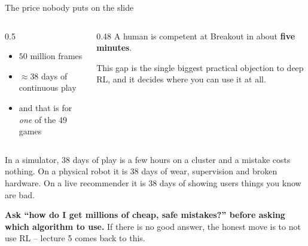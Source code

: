 \documentclass[aspectratio=169]{beamer}
\begin{document}
\begin{frame}{The price nobody puts on the slide}
  \begin{columns}[T]
    \begin{column}{0.5\textwidth}
      \begin{tcolorbox}[colback=armred!8, colframe=armred, boxrule=0.7pt, arc=2pt,
                        title={\textbf{DQN's budget, per game}}]
        \small
        \begin{itemize}\itemsep3pt
          \item $50$ million frames
          \item $\approx 38$ days of continuous play
          \item and that is for \emph{one} of the 49 games
        \end{itemize}
      \end{tcolorbox}
    \end{column}
    \begin{column}{0.48\textwidth}
      \vskip 6pt
      \small
      A human is competent at Breakout in about \textbf{five minutes}.

      \vskip 6pt
      This gap is the single biggest practical objection to deep RL, and it decides where you
      can use it at all.
    \end{column}
  \end{columns}

  \vskip 8pt
  \begin{tcolorbox}[colback=armblue!8, colframe=armblue, boxrule=0.6pt, arc=2pt,
                    title={\textbf{Which is why the simulator matters more than the algorithm}}]
    \small
    In a simulator, 38 days of play is a few hours on a cluster and a mistake costs nothing. On
    a physical robot it is 38 days of wear, supervision and broken hardware. On a live
    recommender it is 38 days of showing users things you know are bad.

    \vskip 4pt
    \textbf{Ask ``how do I get millions of cheap, safe mistakes?'' before asking which algorithm
    to use.} If there is no good answer, the honest move is to not use RL -- lecture 5 comes
    back to this.
  \end{tcolorbox}
\end{frame}
\end{document}
